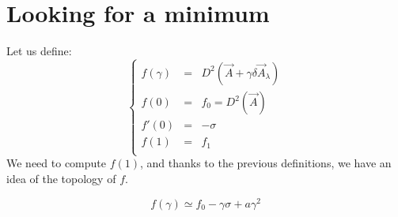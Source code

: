 \documentclass[aps,12pt]{revtex4}
\begin{document}
\section{Looking for a minimum}
Let us define:
\begin{equation}
\left\lbrace
\begin{array}{rcl}
	f(\gamma) & = & D^2(\vec{A}+\gamma \delta\vec{A}_\lambda)\\
	f(0)      & = & f_0 = D^2(\vec{A})\\
	f'(0)     & = & -\sigma\\
	f(1)      & = & f_1\\
\end{array}\right.
\end{equation} 
We need to compute $f(1)$, and thanks to the previous definitions, we have an idea of the topology of $f$.

\begin{equation}
	f(\gamma) \simeq f_0 - \gamma \sigma + a \gamma^2
\end{equation}
 
\end{document}
